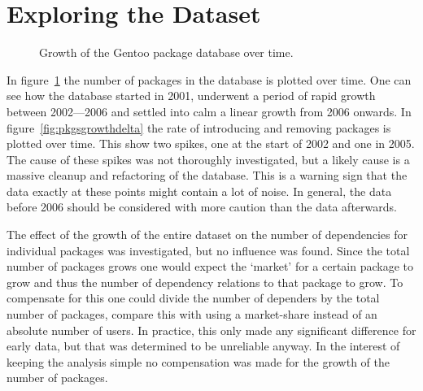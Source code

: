 \documentclass[smallextended,final]{svjour3}
\begin{document}
\section{Exploring the Dataset}


\begin{figure}
\centering
{}
\caption{Growth of the Gentoo package database over time.}\label{fig:pkgsgrowth}
\end{figure}

In figure~\ref{fig:pkgsgrowth} the number of packages in the database is plotted over time. One can see how the database started in 2001, underwent a period of rapid growth between 2002---2006 and settled into calm a linear growth from 2006 onwards. In figure~\ref{fig:pkgsgrowthdelta} the rate of introducing and removing packages is plotted over time. This show two spikes, one at the start of 2002 and one in 2005. The cause of these spikes was not thoroughly investigated, but a likely cause is a massive cleanup and refactoring of the database. This is a warning sign that the data exactly at these points might contain a lot of noise. In general, the data before 2006 should be considered with more caution than the data afterwards.

The effect of the growth of the entire dataset on the number of dependencies for individual packages was investigated, but no influence was found. Since the total number of packages grows one would expect the `market' for a certain package to grow and thus the number of dependency relations to that package to grow. To compensate for this one could divide the number of dependers by the total number of packages, compare this with using a market-share instead of an absolute number of users. In practice, this only made any significant difference for early data, but that was determined to be unreliable anyway. In the interest of keeping the analysis simple no compensation was made for the growth of the number of packages.
\end{document}

